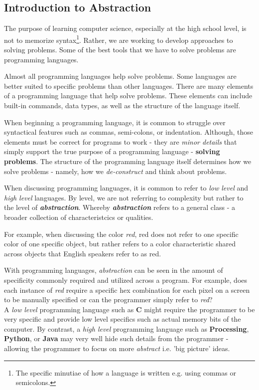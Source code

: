 \documentclass{article}
\begin{document}
\begin{flushleft}
  \section{Introduction to Abstraction}
  \setlength{\parindent}{5ex}
  The purpose of learning computer science, especially at the high school level, is not to memorize syntax\footnote{The specific minutiae of how a language is written e.g. using commas or semicolons.}. Rather, we are working to develop approaches to solving problems. Some of the best tools that we have to solve problems are programming languages.\par
  Almost all programming languages help solve problems. Some languages are better suited to specific problems than other languages. There are many elements of a programming language that help solve problems. These elements can include built-in commands, data types, as well as the structure of the language itself.\par
  When beginning a programming language, it is common to struggle over syntactical features such as commas, semi-colons, or indentation. Although, those elements must be correct for programs to work - they are \textit{minor details} that simply support the true purpose of a programming language - \textbf{solving problems}. The structure of the programming language itself determines how we solve problems - namely, how we \textit{de-construct} and think about problems. \par
  When discussing programming languages, it is common to refer to \textit{low level} and \textit{high level} languages. By level, we are not referring to complexity but rather to the level of \textit{\textbf{abstraction}}. Whereby \textit{\textbf{abstraction}} refers to a general class - a broader collection of characteristcics or qualities. \par
  For example, when discussing the color \textit{red}, red does not refer to one specific color of one specific object, but rather refers to a color characteristic shared across objects that English speakers refer to as red. \par
  With programming languages, \textit{abstraction} can be seen in the amount of specificity commonly required and utilized across a program. For example, does each instance of \textit{red} require a specific hex combination for each pixel on a screen to be manually specified or can the programmer simply refer to \textit{red}?\\
  A \textit{low level} programming language such as \textbf{C} might require the programmer to be very specific and provide low level specifics such as actual memory bits of the computer. By contrast, a \textit{high level} programming language such as \textbf{Processing}, \textbf{Python}, or \textbf{Java} may very well hide such details from the programmer - allowing the programmer to focus on more \textit{abstract} i.e. 'big picture' ideas. \par

\end{flushleft}
\end{document}
